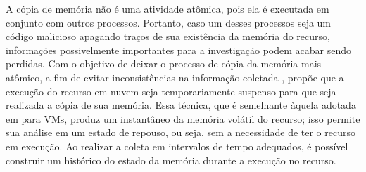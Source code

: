 A cópia de memória não é uma atividade atômica, pois ela é executada em conjunto com outros processos. 
%
Portanto, caso um desses processos seja um código malicioso apagando traços de sua existência da memória do recurso, informações possivelmente importantes para a investigação podem acabar sendo perdidas. 
%
Com o objetivo de deixar o processo de cópia da memória mais atômico, a fim de evitar inconsistências na informação coletada \cite{CaseMemoryForensics:2014}, \fancyname propõe que a execução do recurso em nuvem seja temporariamente suspenso para que seja realizada a cópia de sua memória. 
%
Essa técnica, que é semelhante àquela adotada em \cite{RafiqueStaticLiveDigitalForensics:2013} para VMs, produz um instantâneo da memória volátil do recurso; isso permite sua análise em um estado de repouso, ou seja, sem a necessidade de ter o recurso em execução.
%
Ao realizar a coleta em intervalos de tempo adequados, é possível construir um histórico do estado da memória durante a execução no recurso.
%


